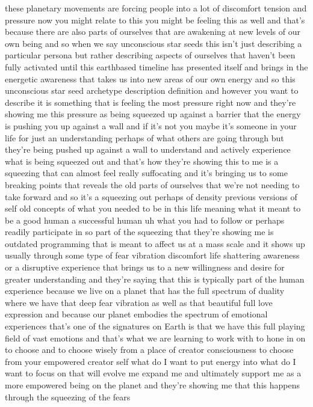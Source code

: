 \documentclass{article}
\begin{document}
these planetary movements are forcing people into a lot of discomfort
tension and pressure now you might relate to this you might be feeling
this as well and that's because there are also parts of ourselves that
are awakening at new levels of our own being and so when we say
unconscious star seeds this isn't just describing a particular persona
but rather describing aspects of ourselves that haven't been fully
activated until this earthbased timeline has presented itself and brings
in the energetic awareness that takes us into new areas of our own
energy and so this unconscious star seed archetype description
definition and however you want to describe it is something that is
feeling the most pressure right now and they're showing me this pressure
as being squeezed up against a barrier that the energy is pushing you up
against a wall and if it's not you maybe it's someone in your life for
just an understanding perhaps of what others are going through but
they're being pushed up against a wall to understand and actively
experience what is being squeezed out and that's how they're showing
this to me is a squeezing that can almost feel really suffocating and
it's bringing us to some breaking points that reveals the old parts of
ourselves that we're not needing to take forward and so it's a squeezing
out perhaps of density previous versions of self old concepts of what
you needed to be in this life meaning what it meant to be a good human a
successful human uh what you had to follow or perhaps readily
participate in so part of the squeezing that they're showing me is
outdated programming that is meant to affect us at a mass scale and it
shows up usually through some type of fear vibration discomfort life
shattering awareness or a disruptive experience that brings us to a new
willingness and desire for greater understanding and they're saying that
this is typically part of the human experience because we live on a
planet that has the full spectrum of duality where we have that deep
fear vibration as well as that beautiful full love expression and
because our planet embodies the spectrum of emotional experiences that's
one of the signatures on Earth is that we have this full playing field
of vast emotions and that's what we are learning to work with to hone in
on to choose and to choose wisely from a place of creator consciousness
to choose from your empowered creator self what do I want to put energy
into what do I want to focus on that will evolve me expand me and
ultimately support me as a more empowered being on the planet and
they're showing me that this happens through the squeezing of the fears
\end{document}
